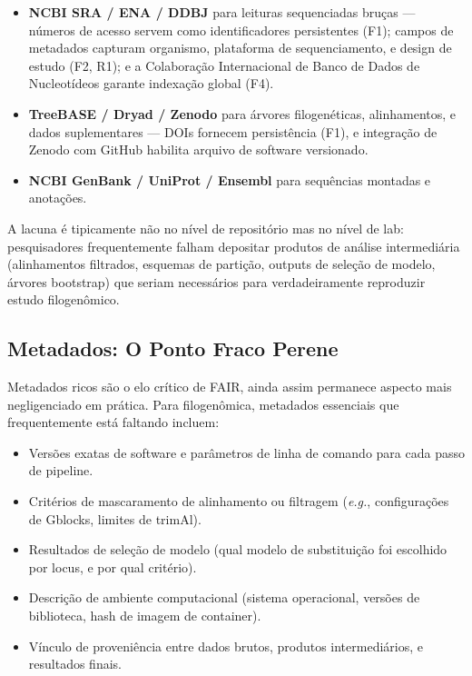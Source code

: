 \begin{itemize}
\item \textbf{NCBI SRA / ENA / DDBJ} para leituras sequenciadas bruças --- números de acesso servem como identificadores persistentes (F1); campos de metadados capturam organismo, plataforma de sequenciamento, e design de estudo (F2, R1); e a Colaboração Internacional de Banco de Dados de Nucleotídeos garante indexação global (F4).

\item \textbf{TreeBASE / Dryad / Zenodo} para árvores filogenéticas, alinhamentos, e dados suplementares --- DOIs fornecem persistência (F1), e integração de Zenodo com GitHub habilita arquivo de software versionado.

\item \textbf{NCBI GenBank / UniProt / Ensembl} para sequências montadas e anotações.
\end{itemize}

A lacuna é tipicamente não no nível de repositório mas no nível de lab: pesquisadores frequentemente falham depositar produtos de análise intermediária (alinhamentos filtrados, esquemas de partição, outputs de seleção de modelo, árvores bootstrap) que seriam necessários para verdadeiramente reproduzir estudo filogenômico.

\subsection{Metadados: O Ponto Fraco Perene}

Metadados ricos são o elo crítico de FAIR, ainda assim permanece aspecto mais negligenciado em prática. Para filogenômica, metadados essenciais que frequentemente está faltando incluem:

\begin{itemize}
\item Versões exatas de software e parâmetros de linha de comando para cada passo de pipeline.
\item Critérios de mascaramento de alinhamento ou filtragem (\textit{e.g.}, configurações de Gblocks, limites de trimAl).
\item Resultados de seleção de modelo (qual modelo de substituição foi escolhido por locus, e por qual critério).
\item Descrição de ambiente computacional (sistema operacional, versões de biblioteca, hash de imagem de container).
\item Vínculo de proveniência entre dados brutos, produtos intermediários, e resultados finais.
\end{itemize}

